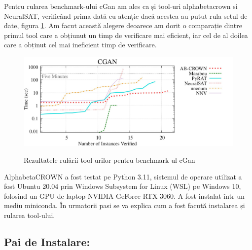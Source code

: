 \hspace{0.5 cm}
Pentru rularea benchmark-ului cGan am ales ca și tool-uri  alpha\textunderscore beta\textunderscore crown si NeuralSAT, verificând prima dată cu atenție dacă acestea au putut rula setul de date, figura \ref{cGan_gr}. Am facut această alegere deoarece am dorit o comparație dintre primul tool care a obțiunut un timp de verificare mai eficient, iar cel de al doilea care a obținut cel mai ineficient timp de verificare.

\begin{figure}[ht]
\centering
{\includegraphics[width=12cm]{imagini/cGan_grafic.jpg}}
\caption{Rezultatele rulării tool-urilor pentru benchmark-ul cGan}
\label{cGan_gr}
\end{figure}

Alpha\textunderscore beta\textunderscore CROWN a fost testat pe Python 3.11, sistemul de operare utilizat a fost  Ubuntu 20.04 prin Windows Subsystem for Linux (WSL) pe Windows 10, folosind un GPU de laptop NVIDIA GeForce RTX 3060.  A fost instalat într-un mediu miniconda. În urmatorii pasi se va explica cum a fost facută instalarea și rularea tool-ului.


\subsection*{Pai de Instalare:}

